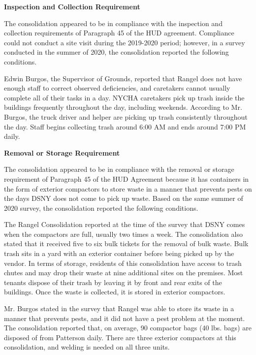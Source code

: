  

\textbf{Inspection and Collection Requirement} 

 

The consolidation appeared to be in compliance with the inspection and collection requirements of Paragraph 45 of the HUD agreement. Compliance could not conduct a site visit during the 2019-2020 period; however, in a survey conducted in the summer of 2020, the consolidation reported the following conditions.

Edwin Burgos, the Supervisor of Grounds, reported that Rangel does not have enough staff to correct observed deficiencies, and caretakers cannot usually complete all of their tasks in a day. NYCHA caretakers pick up trash inside the buildings frequently throughout the day, including weekends. According to Mr. Burgos, the truck driver and helper are picking up trash consistently throughout the day.  Staff begins collecting trash around 6:00 AM and ends around 7:00 PM daily.

 

\textbf{Removal or Storage Requirement} 

The consolidation appeared to be in compliance with the removal or storage requirement of Paragraph  45 of the HUD Agreement because it has containers in the form of exterior compactors to store waste in a manner that prevents pests on the days DSNY does not come to pick up waste. Based on the same summer of  2020 survey, the consolidation reported the following conditions.

 

The Rangel Consolidation reported at the time of the survey that DSNY comes when the compactors are full, usually two times a week. The consolidation also stated that it received five to six bulk tickets for the removal of bulk waste. Bulk trash sits in a yard with an exterior container before being picked up by the vendor. In terms of storage, residents of this consolidation have access to trash chutes and may drop their waste at nine additional sites on the premises.  Most tenants dispose of their trash by leaving it by front and rear exits of the buildings. Once the waste is collected, it is stored in exterior compactors.

 

Mr. Burgos stated in the survey that Rangel was able to store its waste in a manner that prevents pests, and it did not have a pest problem at the moment. The consolidation reported that, on average, 90 compactor bags (40 lbs. bags)  are disposed of from Patterson daily. There are three exterior compactors at this consolidation, and welding is needed on all three units. 

